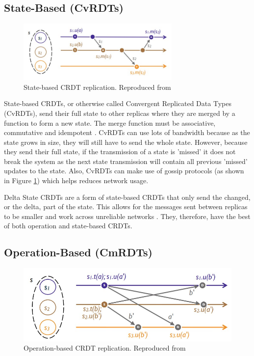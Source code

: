 \documentclass[12pt]{report}
\begin{document}
\subsection{State-Based (CvRDTs)}

\begin{figure}
    \centering
    \includegraphics[width=8cm]{state.jpg}
    \caption{State-based CRDT replication. Reproduced from \cite{10.1007/978-3-642-24550-3_29}}
    \label{fig:statebased}
\end{figure}

State-based CRDTs, or otherwise called Convergent Replicated Data Types (CvRDTs), send their full state to other replicas where they are merged by a function to form a new state. The merge function must be associative, commutative and idempotent \cite{10.1007/978-3-642-24550-3_29}. CvRDTs can use lots of bandwidth because as the state grows in size, they will still have to send the whole state. However, because they send their full state, if the transmission of a state is 'missed' it does not break the system as the next state transmission will contain all previous 'missed' updates to the state. Also, CvRDTs can make use of gossip protocols (as shown in Figure \ref{fig:statebased}) which helps reduces network usage. \par

Delta State CRDTs are a form of state-based CRDTs that only send the changed, or the delta, part of the state. This allows for the messages sent between replicas to be smaller and work across unreliable networks \cite{Almeida_2018}. They, therefore, have the best of both operation and state-based CRDTs.


\subsection{Operation-Based (CmRDTs)}

\begin{figure}
    \centering
    \includegraphics[width=8 cm]{operation.jpg}
    \caption{Operation-based CRDT replication. Reproduced from \cite{10.1007/978-3-642-24550-3_29}}
    \label{fig:operation}
\end{figure}
\end{document}
